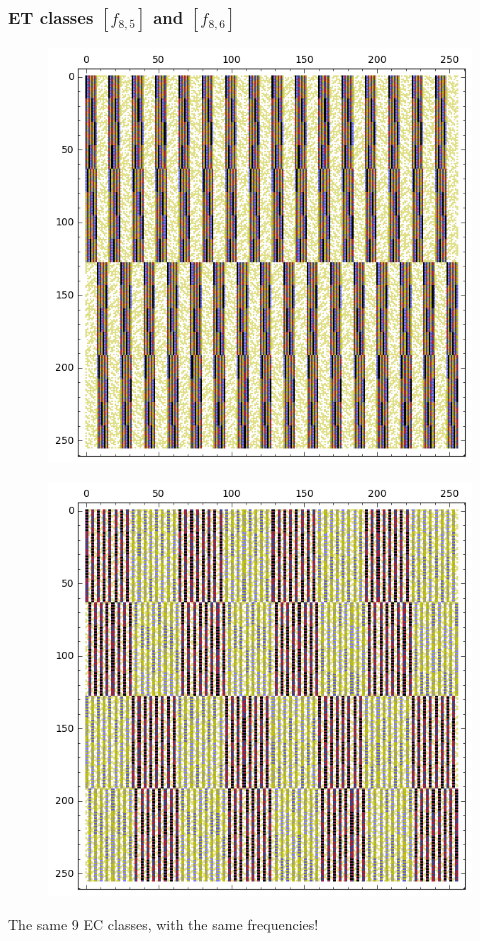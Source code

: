 \documentclass[pdf,sprung,slideColor,nocolorBG]{beamer}
\newenvironment{colortheme}[1]{
\def\ProvidesPackageRCS $##1${\relax}
\renewcommand{\ProcessOptions}{\relax}
\makeatletter

\makeatother
}{}
\begin{document}
\begin{colortheme}{jubata}

\begin{frame}
\frametitle{ET classes  $[f_{8,5}]$ and $[f_{8,6}]$}
\begin{figure}
\centering
\begin{minipage}{.48\textwidth}
  \centering
  \includegraphics[width=.9\linewidth]{../matrix_plot/re8_5_bent_cayley_graph_index_matrix.png}
  \label{fig:re8_5_bent_cayley_graph_index_matrix}
\end{minipage}%
\begin{minipage}{.48\textwidth}
  \centering
  \includegraphics[width=.9\linewidth]{../matrix_plot/re8_6_bent_cayley_graph_index_matrix.png}
  \label{fig:re8_6_bent_cayley_graph_index_matrix}
\end{minipage}
\end{figure}
The same 9 EC classes, with the same frequencies!


\end{frame}
\end{colortheme}
\end{document}
